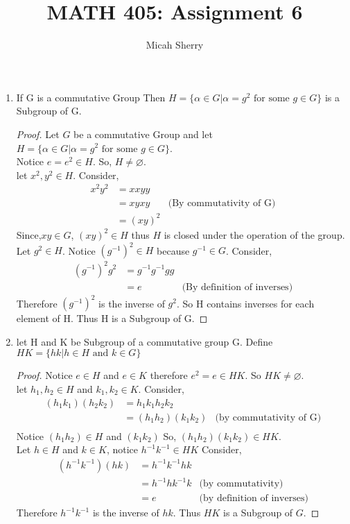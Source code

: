 \documentclass{article}
\title{MATH 405: Assignment 6}
\author{Micah Sherry}
\newcommand{\nullset}{\varnothing}
\begin{document}
	\maketitle
	\begin{enumerate}
		\item If G is a commutative Group Then $H =\{\alpha \in G |\alpha = g^2 \text{ for some } g \in G\}$ is a Subgroup of G.
		\begin{proof}
			Let $G$ be a commutative Group and let $H =\{\alpha \in G |\alpha = g^2 \text{ for some } g \in G\}$.
			\\
			Notice $e = e^2 \in H$. So, $H \neq \nullset$.
			\\ let $x^2, y^2 \in H$. Consider,
			\begin{align*}
				x^2y^2  &= xxyy\\
						&= xyxy &\text{(By commutativity of G)}\\
						&= (xy)^2
			\end{align*}
			Since,$xy \in G$, $(xy)^2 \in H$ thus $H$ is closed under the operation of the group.\\
			Let $g^2 \in H$. Notice $(g^{-1})^2 \in H$ because $g^{-1} \in G$.  
			Consider,
			\begin{align*}
				(g^{-1})^2g^2   &= g^{-1}g^{-1}gg \\
								&= e  &\text{(By definition of inverses)} 
			\end{align*}
			Therefore $(g^{-1})^2$ is the inverse of $g^2$. So H contains inverses for each element of H. Thus H is a Subgroup of G. 
		\end{proof}

		\item let H and K be Subgroup of a commutative group G. Define $HK = \{hk| h \in H \text{ and } k \in G\}$
		\begin{proof}
			Notice $e \in H $ and $e \in K$ therefore $e^2 = e \in HK$. So $HK \neq \nullset$. \\
			let $h_1, h_2 \in H$ and $k_1, k_2 \in K$. 
			Consider,
			\begin{align*}
				(h_1k_1)(h_2k_2)&=h_1k_1h_2k_2\\
								&= (h_1h_2)(k_1k_2) &\text{(by commutativity of G)}\\			
			\end{align*}
			Notice $(h_1h_2)\in H $ and $ (k_1k_2)$ So, $(h_1h_2)(k_1k_2) \in HK$.\\
			Let $h \in H$ and $k \in K$, notice $h^{-1}k^{-1} \in HK$ Consider,
			\begin{align*}
				(h^{-1}k^{-1})(hk) &= h^{-1}k^{-1}hk\\
									&= h^{-1}hk^{-1}k &\text{(by commutativity)}\\
									&= e &\text{(by definition of inverses)}
			\end{align*} 
			Therefore $h^{-1}k^{-1}$ is the inverse of $hk$. Thus $HK$ is a Subgroup of $G$.
		\end{proof}


\end{enumerate}
\end{document}
